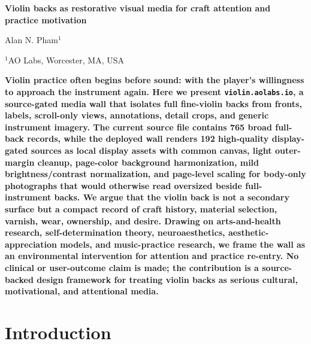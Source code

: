 \documentclass[12pt,letterpaper]{article}
\begin{document}
\linenumbers
\thispagestyle{empty}

\begin{center}
    \vspace*{-0.6em}

    {\fontsize{20}{22}\selectfont\bfseries\color{SumiInk}
    Violin backs as restorative visual media for craft attention and practice motivation\par}

    \vspace{0.95em}

    {\normalsize\color{SumiInk}
    Alan N. Pham$^{1}$\par}

    \vspace{0.38em}

    {\small\color{DustyTaupe}
    $^{1}$AO Labs, Worcester, MA, USA\par}
\end{center}

\vspace{0.35em}
\noindent\textbf{Violin practice often begins before sound: with the player's willingness to approach the instrument again. Here we present \texttt{violin.aolabs.io}, a source-gated media wall that isolates full fine-violin backs from fronts, labels, scroll-only views, annotations, detail crops, and generic instrument imagery. The current source file contains 765 broad full-back records, while the deployed wall renders 192 high-quality display-gated sources as local display assets with common canvas, light outer-margin cleanup, page-color background harmonization, mild brightness/contrast normalization, and page-level scaling for body-only photographs that would otherwise read oversized beside full-instrument backs. We argue that the violin back is not a secondary surface but a compact record of craft history, material selection, varnish, wear, ownership, and desire. Drawing on arts-and-health research, self-determination theory, neuroaesthetics, aesthetic-appreciation models, and music-practice research, we frame the wall as an environmental intervention for attention and practice re-entry. No clinical or user-outcome claim is made; the contribution is a source-backed design framework for treating violin backs as serious cultural, motivational, and attentional media.}

\newpage
\pagestyle{fancy}

\section{Introduction}
\end{document}
